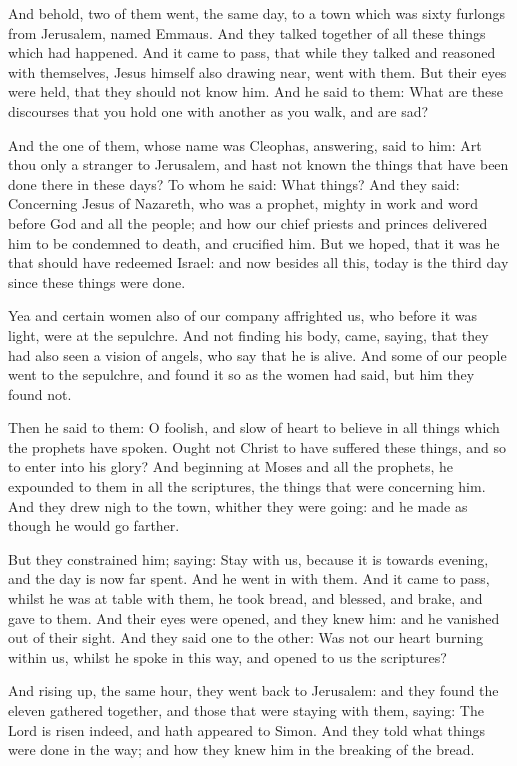 \begin{multicols}{2}\small
And behold, two of them went, the same day, to a town which was sixty furlongs from Jerusalem, named Emmaus. And they
talked together of all these things which had happened. And it came to pass, that while they talked and reasoned with
themselves, Jesus himself also drawing near, went with them. But their eyes were held, that they should not know him.
And he said to them: What are these discourses that you hold one with another as you walk, and are sad?

And the one of them, whose name was Cleophas, answering, said to him: Art thou only a stranger to Jerusalem, and hast
not known the things that have been done there in these days? To whom he said: What things? And they said: Concerning
Jesus of Nazareth, who was a prophet, mighty in work and word before God and all the people; and how our chief priests
and princes delivered him to be condemned to death, and crucified him. But we hoped, that it was he that should have
redeemed Israel: and now besides all this, today is the third day since these things were done.

Yea and certain women also of our company affrighted us, who before it was light, were at the sepulchre. And not finding
his body, came, saying, that they had also seen a vision of angels, who say that he is alive. And some of our people
went to the sepulchre, and found it so as the women had said, but him they found not.

Then he said to them: O foolish, and slow of heart to believe in all things which the prophets have spoken. Ought not
Christ to have suffered these things, and so to enter into his glory? And beginning at Moses and all the prophets, he
expounded to them in all the scriptures, the things that were concerning him. And they drew nigh to the town, whither
they were going: and he made as though he would go farther.

But they constrained him; saying: Stay with us, because it is towards evening, and the day is now far spent. And he went
in with them. And it came to pass, whilst he was at table with them, he took bread, and blessed, and brake, and gave to
them. And their eyes were opened, and they knew him: and he vanished out of their sight. And they said one to the
other: Was not our heart burning within us, whilst he spoke in this way, and opened to us the scriptures?

And rising up, the same hour, they went back to Jerusalem: and they found the eleven gathered together, and those that
were staying with them, saying: The Lord is risen indeed, and hath appeared to Simon. And they told what things were
done in the way; and how they knew him in the breaking of the bread. 
\end{multicols}

